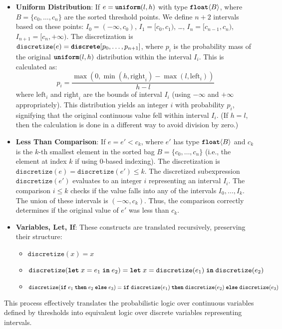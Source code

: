 \documentclass[nonacm,anonymous]{acmart}
\newcommand{\letkw}{\text{\ttfamily\bfseries let}}
\newcommand{\inkw}{\text{\ttfamily\bfseries in}}
\newcommand{\ifkw}{\text{\ttfamily\bfseries if}}
\newcommand{\thenkw}{\text{\ttfamily\bfseries then}}
\newcommand{\elsekw}{\text{\ttfamily\bfseries else}}
\newcommand{\uniform}{\text{\ttfamily\bfseries uniform}}
\newcommand{\discrete}{\text{\ttfamily\bfseries discrete}}
\newcommand{\float}{\text{\ttfamily\bfseries float}}
\begin{document}
\begin{itemize}
    \item \textbf{Uniform Distribution}: If $e = \uniform(l, h)$ with type $\float\langle B \rangle$, where $B = \{c_0, \dots, c_n\}$ are the sorted threshold points. We define $n+2$ intervals based on these points: $I_0 = (-\infty, c_0)$, $I_1 = [c_0, c_1)$, \dots, $I_n = [c_{n-1}, c_n)$, $I_{n+1} = [c_n, +\infty)$. The discretization is $\texttt{discretize}(e) = \discrete[p_0, \dots, p_{n+1}]$, where $p_i$ is the probability mass of the original $\uniform(l, h)$ distribution within the interval $I_i$. This is calculated as:
    \[ p_i = \frac{\max(0, \min(h, \text{right}_i) - \max(l, \text{left}_i))}{h - l} \]
    where $\text{left}_i$ and $\text{right}_i$ are the bounds of interval $I_i$ (using $-\infty$ and $+\infty$ appropriately). This \discrete{} distribution yields an integer $i$ with probability $p_i$, signifying that the original continuous value fell within interval $I_i$. (If $h = l$, then the calculation is done in a different way to avoid division by zero.)

    \item \textbf{Less Than Comparison}: If $e = e' < c_k$, where $e'$ has type $\float\langle B \rangle$ and $c_k$ is the $k$-th smallest element in the sorted bag $B = \{c_0, \dots, c_n\}$ (i.e., the element at index $k$ if using 0-based indexing). The discretization is $\texttt{discretize}(e) = \texttt{discretize}(e') \leq k$. The discretized subexpression $\texttt{discretize}(e')$ evaluates to an integer $i$ representing an interval $I_i$. The comparison $i \leq k$ checks if the value falls into any of the intervals $I_0, \dots, I_k$. The union of these intervals is $(-\infty, c_k)$. Thus, the comparison correctly determines if the original value of $e'$ was less than $c_k$.

    \item \textbf{Variables, Let, If}: These constructs are translated recursively, preserving their structure:
    \begin{itemize}
        \item $\texttt{discretize}(x) = x$
        \item $\texttt{discretize}(\letkw \; x = e_1 \; \inkw \; e_2) = \letkw \; x = \texttt{discretize}(e_1) \; \inkw \; \texttt{discretize}(e_2)$
        \item $\texttt{discretize}(\ifkw \; e_1 \; \thenkw \; e_2 \; \elsekw \; e_3) = \ifkw \; \texttt{discretize}(e_1) \; \thenkw \; \texttt{discretize}(e_2) \; \elsekw \; \texttt{discretize}(e_3)$
    \end{itemize}
\end{itemize}

This process effectively translates the probabilistic logic over continuous variables defined by thresholds into equivalent logic over discrete variables representing intervals.
\end{document}
